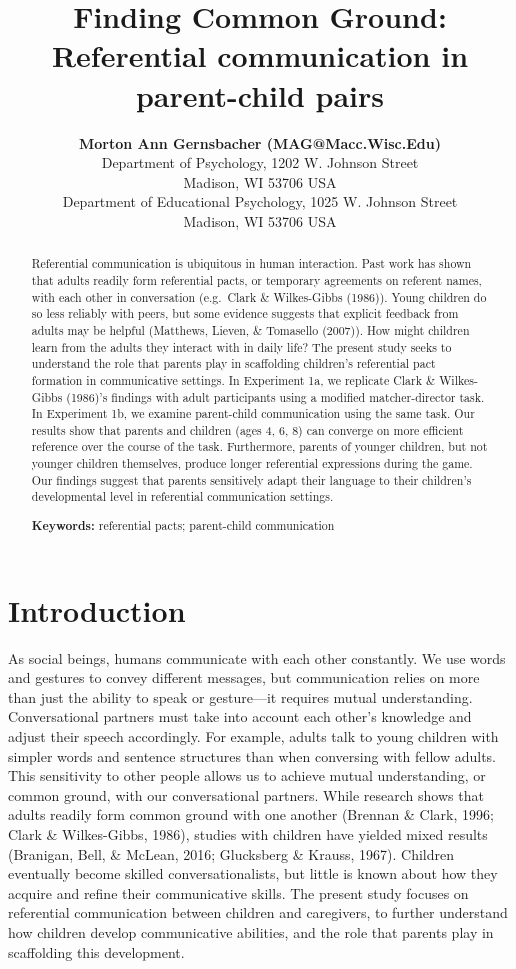\documentclass[10pt, letterpaper]{article}
\title{Finding Common Ground: Referential communication in parent-child pairs}
\author{{\large \bf Morton Ann Gernsbacher (MAG@Macc.Wisc.Edu)} \\ Department of Psychology, 1202 W. Johnson Street \\ Madison, WI 53706 USA \AND {\large \bf Sharon J.~Derry (SDJ@Macc.Wisc.Edu)} \\ Department of Educational Psychology, 1025 W. Johnson Street \\ Madison, WI 53706 USA}
\begin{document}
\maketitle

\begin{abstract}
Referential communication is ubiquitous in human interaction. Past work
has shown that adults readily form referential pacts, or temporary
agreements on referent names, with each other in conversation
(e.g.~Clark \& Wilkes-Gibbs (1986)). Young children do so less reliably
with peers, but some evidence suggests that explicit feedback from
adults may be helpful (Matthews, Lieven, \& Tomasello (2007)). How might
children learn from the adults they interact with in daily life? The
present study seeks to understand the role that parents play in
scaffolding children's referential pact formation in communicative
settings. In Experiment 1a, we replicate Clark \& Wilkes-Gibbs (1986)'s
findings with adult participants using a modified matcher-director task.
In Experiment 1b, we examine parent-child communication using the same
task. Our results show that parents and children (ages 4, 6, 8) can
converge on more efficient reference over the course of the task.
Furthermore, parents of younger children, but not younger children
themselves, produce longer referential expressions during the game. Our
findings suggest that parents sensitively adapt their language to their
children's developmental level in referential communication settings.

\textbf{Keywords:}
referential pacts; parent-child communication
\end{abstract}

\hypertarget{introduction}{%
\section{Introduction}\label{introduction}}

As social beings, humans communicate with each other constantly. We use
words and gestures to convey different messages, but communication
relies on more than just the ability to speak or gesture---it requires
mutual understanding. Conversational partners must take into account
each other's knowledge and adjust their speech accordingly. For example,
adults talk to young children with simpler words and sentence structures
than when conversing with fellow adults. This sensitivity to other
people allows us to achieve mutual understanding, or common ground, with
our conversational partners. While research shows that adults readily
form common ground with one another (Brennan \& Clark, 1996; Clark \&
Wilkes-Gibbs, 1986), studies with children have yielded mixed results
(Branigan, Bell, \& McLean, 2016; Glucksberg \& Krauss, 1967). Children
eventually become skilled conversationalists, but little is known about
how they acquire and refine their communicative skills. The present
study focuses on referential communication between children and
caregivers, to further understand how children develop communicative
abilities, and the role that parents play in scaffolding this
development.
\end{document}
